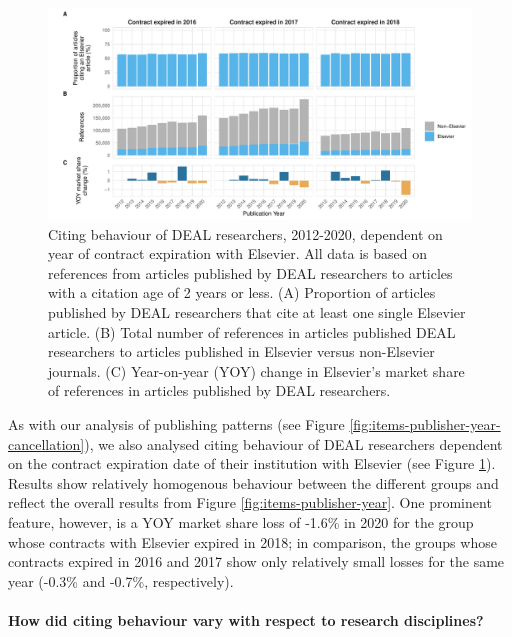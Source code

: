 \documentclass[
]{article}
\begin{document}
\begin{figure}
\centering
\includegraphics{analysis_files/figure-latex/references-publisher-year-cancellation-1.pdf}
\caption{\label{fig:references-publisher-year-cancellation}Citing behaviour of DEAL researchers, 2012-2020, dependent on year of contract expiration with Elsevier. All data is based on references from articles published by DEAL researchers to articles with a citation age of 2 years or less. (A) Proportion of articles published by DEAL researchers that cite at least one single Elsevier article. (B) Total number of references in articles published DEAL researchers to articles published in Elsevier versus non-Elsevier journals. (C) Year-on-year (YOY) change in Elsevier's market share of references in articles published by DEAL researchers.}
\end{figure}

As with our analysis of publishing patterns (see Figure \ref{fig:items-publisher-year-cancellation}), we also analysed citing behaviour of DEAL researchers dependent on the contract expiration date of their institution with Elsevier (see Figure \ref{fig:references-publisher-year-cancellation}). Results show relatively homogenous behaviour between the different groups and reflect the overall results from Figure \ref{fig:items-publisher-year}. One prominent feature, however, is a YOY market share loss of -1.6\% in 2020 for the group whose contracts with Elsevier expired in 2018; in comparison, the groups whose contracts expired in 2016 and 2017 show only relatively small losses for the same year (-0.3\% and -0.7\%, respectively).

\hypertarget{how-did-citing-behaviour-vary-with-respect-to-research-disciplines}{%
\paragraph{How did citing behaviour vary with respect to research disciplines?}\label{how-did-citing-behaviour-vary-with-respect-to-research-disciplines}}
\end{document}
